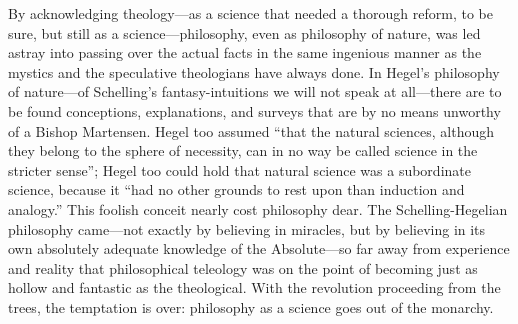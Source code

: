 \documentclass[12pt]{book}
\newcommand{\opage}[1]{\marginnote{\footnotesize\textit{[#1]}}}
\begin{document}
By acknowledging theology---as a science that needed a thorough reform, to be sure, but still as a science---philosophy, even as philosophy of nature, was led astray into passing over the actual facts in the same ingenious manner as the mystics and the speculative theologians have always done. In Hegel's philosophy of nature---of Schelling's fantasy-intuitions we will not speak at all---there are to be found conceptions, explanations, and surveys that are by no means unworthy of a Bishop Martensen. Hegel too assumed ``that the natural sciences, although they belong to the sphere of necessity, can in no way be called science in the stricter sense''; Hegel too could hold that natural science was a subordinate science, because it ``had no other grounds
\opage{111}\setcounter{footnote}{0}%
to rest upon than induction and analogy.'' This foolish conceit nearly cost philosophy dear. The Schelling-Hegelian philosophy came---not exactly by believing in miracles, but by believing in its own absolutely adequate knowledge of the Absolute---so far away from experience and reality that philosophical teleology was on the point of becoming just as hollow and fantastic as the theological. With the revolution proceeding from the trees, the temptation is over: philosophy as a science goes out of the monarchy.
\end{document}
